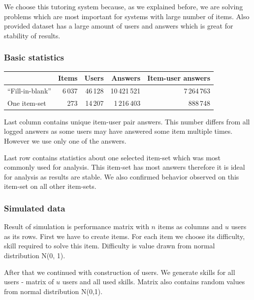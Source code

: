 \documentclass[
  digital, %
  table,   %
  nolof,     %
  nolot,     %
  nocover
]{fithesis3}
\begin{document}


We choose this tutoring system because, as we explained before, we are solving problems which are most important for systems with large number of items. Also provided dataset has a large amount of users and answers which is great for stability of results.

\subsubsection{Basic statistics}\label{basic-statistics}

\begin{center}
  \begin{tabular}{|l|r r r r|}
    \hline
     & Items & Users & Answers & Item-user answers \\
    \hline\hline
    ``Fill-in-blank'' & 6\,037 & 46\,128 & 10\,421\,521 & 7\,264\,763 \\
    \hline
    One item-set & 273 & 14\,207 & 1\,216\,403 & 888\,748 \\
    \hline
  \end{tabular}
\end{center}

Last column contains unique item-user pair answers. This number differs from all logged answers as some users may have answered some item multiple times. However we use only one of the answers.

Last row contains statistics about one selected item-set which was most commonly used for analysis. This item-set has most answers therefore it is ideal for analysis as results are stable. We also confirmed behavior observed on this item-set on all other item-sets.

\subsubsection{Simulated data}\label{simulated-data}

Result of simulation is performance matrix with $n$ items as columns and $u$ users as its rows. First we have to create items. For each item we choose its difficulty, skill required to solve this item. Difficulty is value drawn from normal distribution N(0, 1).

After that we continued with construction of users. We generate skills for all users - matrix of $u$ users and all used skills. Matrix also contains random values from normal distribution N(0,1).
\end{document}
